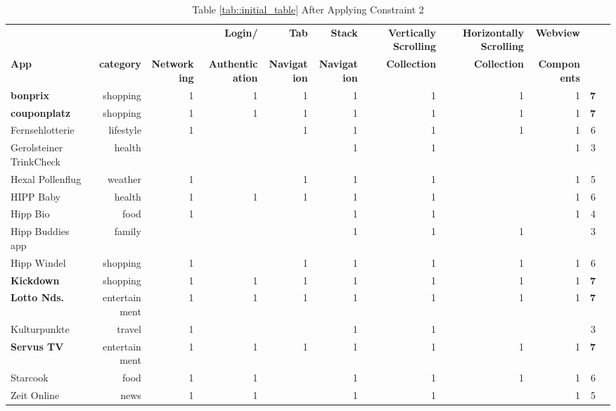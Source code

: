 {\begin{landscape}
\begin{center}
            \begin{table}[!htp]
                \caption{Table \ref{tab::initial_table} After Applying Constraint 2}\label{tab::filtered_table}
                \tiny
                \begin{tabular}{lrrrrrrrrrr}\toprule
                \textbf{} & & &\textbf{Login/} &\textbf{Tab} &\textbf{Stack} &\textbf{Vertically Scrolling} &\textbf{Horizontally Scrolling} &\textbf{Webview} & \\
                \textbf{App} &\textbf{category} &\textbf{Networking} &\textbf{Authentication} &\textbf{Navigation} &\textbf{Navigation} &\textbf{Collection} &\textbf{Collection} &\textbf{Components} & \\\midrule
                \cellcolor[HTML]{A8A8A8}\textbf{bonprix} &shopping &1 &1 &1 &1 &1 &1 &1 &\cellcolor[HTML]{A8A8A8}\textbf{7} \\
                \cellcolor[HTML]{A8A8A8}\textbf{couponplatz} &shopping &1 &1 &1 &1 &1 &1 &1 &\cellcolor[HTML]{A8A8A8}\textbf{7} \\
                Fernsehlotterie &lifestyle &1 & &1 &1 &1 &1 &1 &6 \\
                Gerolsteiner TrinkCheck &health & & & &1 &1 & &1 &3 \\
                Hexal Pollenflug &weather &1 & &1 &1 &1 & &1 &5 \\
                HIPP Baby &health &1 &1 &1 &1 &1 & &1 &6 \\
                Hipp Bio &food &1 & & &1 &1 & &1 &4 \\
                Hipp Buddies app &family & & & &1 &1 &1 & &3 \\
                Hipp Windel &shopping &1 & &1 &1 &1 &1 &1 &6 \\
                \cellcolor[HTML]{A8A8A8}\textbf{Kickdown} &shopping &1 &1 &1 &1 &1 &1 &1 &\cellcolor[HTML]{A8A8A8}\textbf{7} \\
                \cellcolor[HTML]{A8A8A8}\textbf{Lotto Nds.} &entertainment &1 &1 &1 &1 &1 &1 &1 &\cellcolor[HTML]{A8A8A8}\textbf{7} \\
                Kulturpunkte &travel &1 & & &1 &1 & & &3 \\
                \cellcolor[HTML]{A8A8A8}\textbf{Servus TV} &entertainment &1 &1 &1 &1 &1 &1 &1 &\cellcolor[HTML]{A8A8A8}\textbf{7} \\
                Starcook &food &1 &1 & &1 &1 &1 &1 &6 \\
                Zeit Online &news &1 &1 & &1 &1 & &1 &5 \\
                \bottomrule
                \end{tabular}
            \end{table}


        \end{center}
    \end{landscape}
}

